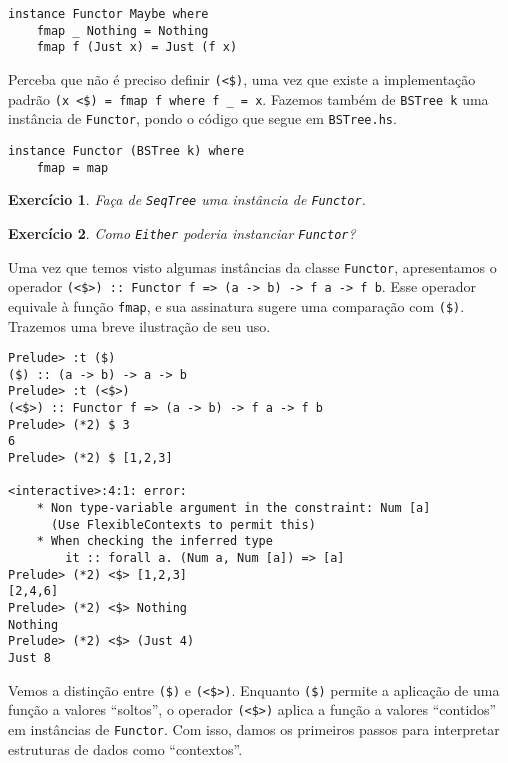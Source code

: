 \documentclass[a4paper]{article}
\newtheorem{exercicio}{Exercício}
\begin{document}
\begin{verbatim}
instance Functor Maybe where
	fmap _ Nothing = Nothing
	fmap f (Just x) = Just (f x)
\end{verbatim}

Perceba que não é preciso definir \texttt{(<\$)}, uma vez que existe a implementação padrão \mbox{\texttt{(x <\$) = fmap f where f \_ = x}}.
Fazemos também de \texttt{BSTree k} uma instância de \texttt{Functor}, pondo o código que segue em \texttt{BSTree.hs}.

\begin{verbatim}
instance Functor (BSTree k) where
	fmap = map
\end{verbatim}

\begin{exercicio}
	Faça de \emph{\texttt{SeqTree}} uma instância de \emph{\texttt{Functor}}.
\end{exercicio}

\begin{exercicio}
	Como \emph{\texttt{Either}} poderia instanciar \emph{\texttt{Functor}}?
\end{exercicio}

Uma vez que temos visto algumas instâncias da classe \texttt{Functor}, apresentamos o operador \mbox{\texttt{(<\$>) :: Functor f => (a -> b) -> f a -> f b}}.
Esse operador equivale à função \texttt{fmap}, e sua assinatura sugere uma comparação com \texttt{(\$)}.
Trazemos uma breve ilustração de seu uso.

\pagebreak

\begin{verbatim}
Prelude> :t ($)
($) :: (a -> b) -> a -> b
Prelude> :t (<$>)
(<$>) :: Functor f => (a -> b) -> f a -> f b
Prelude> (*2) $ 3
6
Prelude> (*2) $ [1,2,3]

<interactive>:4:1: error:
	* Non type-variable argument in the constraint: Num [a]
	  (Use FlexibleContexts to permit this)
	* When checking the inferred type
		it :: forall a. (Num a, Num [a]) => [a]
Prelude> (*2) <$> [1,2,3]
[2,4,6]
Prelude> (*2) <$> Nothing
Nothing
Prelude> (*2) <$> (Just 4)
Just 8
\end{verbatim}

Vemos a distinção entre \texttt{(\$)} e \texttt{(<\$>)}.
Enquanto \texttt{(\$)} permite a aplicação de uma função a valores ``soltos'', o operador \texttt{(<\$>)} aplica a função a valores ``contidos'' em instâncias de \texttt{Functor}.
Com isso, damos os primeiros passos para interpretar estruturas de dados como ``contextos''.
\end{document}
